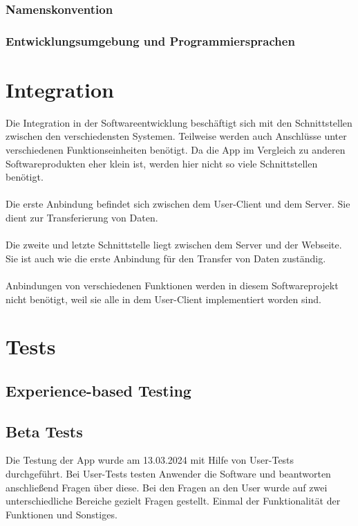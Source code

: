 \documentclass[conference]{IEEEtran}
\begin{document}
\subsubsection{Namenskonvention}

\subsubsection{Entwicklungsumgebung und Programmiersprachen}



\section{Integration}
Die Integration in der Softwareentwicklung beschäftigt sich mit den Schnittstellen zwischen den verschiedensten Systemen. Teilweise werden auch Anschlüsse unter verschiedenen Funktionseinheiten benötigt. Da die App im Vergleich zu anderen Softwareprodukten eher klein ist, werden hier nicht so viele Schnittstellen benötigt. \\\\ Die erste Anbindung befindet sich zwischen dem User-Client und dem Server. Sie dient zur Transferierung von Daten. \\\\ Die zweite und letzte Schnittstelle liegt zwischen dem Server und der Webseite. Sie ist auch wie die erste Anbindung für den Transfer von Daten zuständig. \\\\ Anbindungen von verschiedenen Funktionen werden in diesem Softwareprojekt nicht benötigt, weil sie alle in dem User-Client implementiert worden sind.

\section{Tests}

\subsection{Experience-based Testing}

\subsection{Beta Tests}
Die Testung der App wurde am 13.03.2024 mit Hilfe von User-Tests durchgeführt. Bei User-Tests testen Anwender die Software und beantworten anschließend Fragen über diese. Bei den Fragen an den User wurde auf zwei unterschiedliche Bereiche gezielt Fragen gestellt. Einmal der Funktionalität der Funktionen und Sonstiges.
\end{document}
